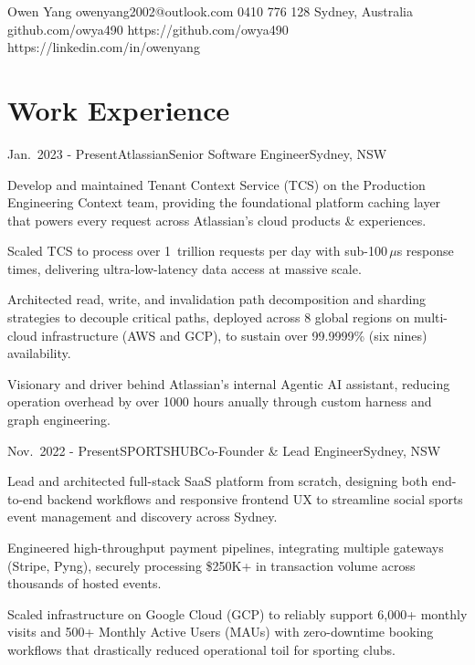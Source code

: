 
\renewcommand{\profilephoto}{profile.jpg}

\ResumeHeader
  {Owen Yang}
  {owenyang2002@outlook.com}
  {0410 776 128}
  {Sydney, Australia}
  {github.com/owya490}
  {https://github.com/owya490}
  {https://linkedin.com/in/owenyang}

\section{Work Experience}

\begin{WorkEntry}{Jan.\ 2023 - Present}{Atlassian}{Senior Software Engineer}{Sydney, NSW}
  \item Develop and maintained Tenant Context Service (TCS) on the Production Engineering Context team, providing the foundational platform caching layer that powers every request across Atlassian's cloud products \& experiences.
  \item Scaled TCS to process over 1~trillion requests per day with sub-100\,$\mu$s response times, delivering ultra-low-latency data access at massive scale.
  \item Architected read, write, and invalidation path decomposition and sharding strategies to decouple critical paths, deployed across 8 global regions on multi-cloud infrastructure (AWS and GCP), to sustain over 99.9999\% (six nines) availability.
  \item Visionary and driver behind Atlassian's internal Agentic AI assistant, reducing operation overhead by over 1000 hours anually through custom harness and graph engineering.
\end{WorkEntry}

\begin{WorkEntry}{Nov.\ 2022 - Present}{SPORTSHUB}{Co-Founder \& Lead Engineer}{Sydney, NSW}
  \item Lead and architected full-stack SaaS platform from scratch, designing both end-to-end backend workflows and responsive frontend UX to streamline social sports event management and discovery across Sydney.
  \item Engineered high-throughput payment pipelines, integrating multiple gateways (Stripe, Pyng), securely processing \$250K+ in transaction volume across thousands of hosted events.
  \item Scaled infrastructure on Google Cloud (GCP) to reliably support 6{,}000+ monthly visits and 500+ Monthly Active Users (MAUs) with zero-downtime booking workflows that drastically reduced operational toil for sporting clubs.
\end{WorkEntry}

